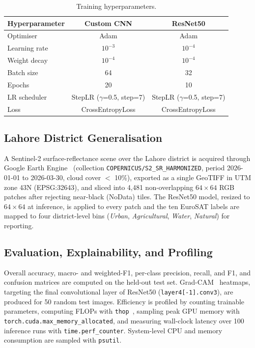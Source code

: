 \documentclass[conference]{IEEEtran}
\begin{document}
\begin{table}[t]
\caption{Training hyperparameters.}
\label{tab:hp}
\centering
\begin{tabular}{lcc}
\toprule
Hyperparameter & Custom CNN & ResNet50 \\
\midrule
Optimiser & Adam & Adam \\
Learning rate & $10^{-3}$ & $10^{-4}$ \\
Weight decay & $10^{-4}$ & $10^{-4}$ \\
Batch size & 64 & 32 \\
Epochs & 20 & 10 \\
LR scheduler & StepLR ($\gamma$=0.5, step=7) & StepLR ($\gamma$=0.5, step=7) \\
Loss & CrossEntropyLoss & CrossEntropyLoss \\
\bottomrule
\end{tabular}
\end{table}

\subsection{Lahore District Generalisation}

A Sentinel-2 surface-reflectance scene over the Lahore district is
acquired through Google Earth Engine~\cite{gorelick2017gee} (collection
\texttt{COPERNICUS/S2\_SR\_HARMONIZED}, period 2026-01-01 to
2026-03-30, cloud cover $<$ 10\%), exported as a single GeoTIFF in
UTM zone 43N (EPSG:32643), and sliced into 4{,}481 non-overlapping
$64\times64$ RGB patches after rejecting near-black (NoData) tiles.
The ResNet50 model, resized to $64\times64$ at inference, is applied
to every patch and the ten EuroSAT labels are mapped to four
district-level bins (\emph{Urban}, \emph{Agricultural}, \emph{Water},
\emph{Natural}) for reporting.

\subsection{Evaluation, Explainability, and Profiling}

Overall accuracy, macro- and weighted-F1, per-class precision,
recall, and F1, and confusion matrices are computed on the held-out
test set. Grad-CAM~\cite{selvaraju2017gradcam} heatmaps, targeting
the final convolutional layer of ResNet50
(\texttt{layer4[-1].conv3}), are produced for 50 random test images.
Efficiency is profiled by counting trainable parameters, computing
FLOPs with \texttt{thop}~\cite{thop}, sampling peak GPU memory with
\texttt{torch.cuda.max\_memory\_allocated}, and measuring
wall-clock latency over 100 inference runs with
\texttt{time.perf\_counter}. System-level CPU and memory consumption
are sampled with \texttt{psutil}.
\end{document}
